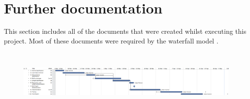 \chapter{Further documentation}

This section includes all of the documents that were created whilst executing this project. Most of these documents were required by the waterfall model \cite{waterfall}.


\begin{figure}[H]
  \centering
  \includegraphics[height=1.25in, angle=90]{docs/gantt.png}
\end{figure}
 
 
 
 
 
